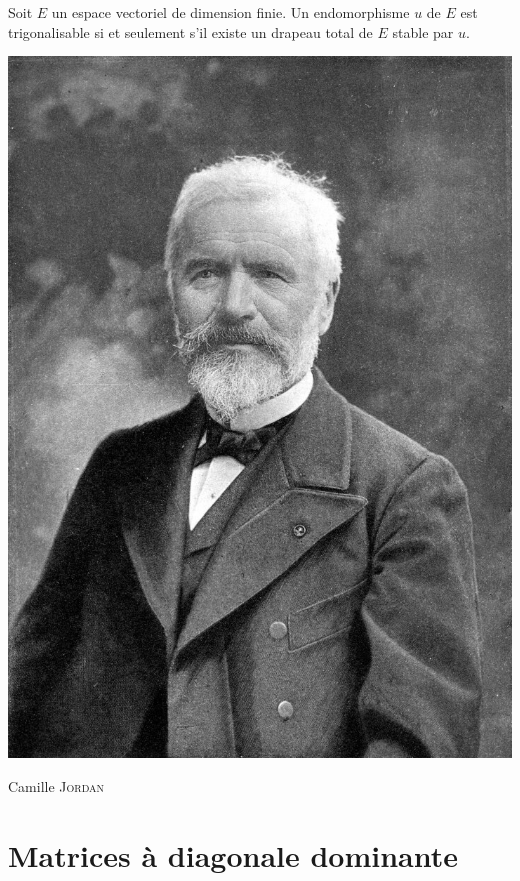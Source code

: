 Soit $E$ un espace vectoriel de dimension finie. Un endomorphisme $u$ de $E$ est trigonalisable si et seulement s'il existe un drapeau total de $E$ stable par $u$. 

\begin{marginfigure}[-19cm]
    \includegraphics{images/camille_jordan.jpg}
    \caption{Camille \textsc{Jordan}}
\end{marginfigure}

\section{Matrices à diagonale dominante}


%        


